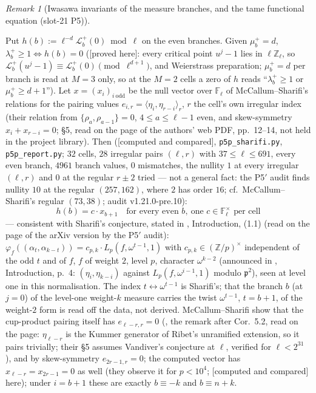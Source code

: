 \documentclass[11pt]{article}
\theoremstyle{remark}
\newtheorem{remark}[theorem]{Remark}
\newcommand{\F}{\mathbb{F}}
\newcommand{\Z}{\mathbb{Z}}
\newcommand{\PROVED}{\textsf{[proved here]}}
\newcommand{\CMPD}{\textsf{[computed and compared]}}   %
\begin{document}
\begin{remark}[Iwasawa invariants of the measure branches, and the tame functional equation (slot-21 P5)]
\begin{enumerate}
  Put $h(b):=\ell^{-d}\mathcal L^{+}_b(0)\bmod\ell$ on the even branches. Given $\mu^{+}_b=d$, $\lambda^{+}_b\ge1\iff h(b)=0$ (\PROVED: every critical point $u^{j}-1$ lies in $\ell\Z_\ell$, so
  $\mathcal L^{+}_b(u^{j}-1)\equiv\mathcal L^{+}_b(0)\pmod{\ell^{d+1}}$, and Weierstrass preparation; $\mu^{+}_b=d$ per branch is read at $M=3$ only, so at the $M=2$ cells a zero of $h$ reads
  ``$\lambda^{+}_b\ge1$ or $\mu^{+}_b\ge d+1$''). Let $x=(x_i)_{i\ \mathrm{odd}}$ be the null vector over $\F_\ell$ of McCallum--Sharifi's relations for the pairing values
  $e_{i,r}=\langle\eta_i,\eta_{r-i}\rangle_r$, $r$ the cell's own irregular index (their relation from $\{\rho_a,\rho_{a-1}\}=0$, $4\le a\le\ell-1$ even, and skew-symmetry $x_i+x_{r-i}=0$;
  \cite{mccallum_sharifi} \S5, read on the page of the authors' web PDF, pp.~12--14, not held in the project library). Then (\CMPD, \texttt{p5p\_sharifi.py}, \texttt{p5p\_report.py}; $32$ cells,
  $28$ irregular pairs $(\ell,r)$ with $37\le\ell\le691$, every even branch, $4961$ branch values, $0$ mismatches, the nullity $1$ at every irregular $(\ell,r)$ and $0$ at the regular $r\pm2$ tried --- not a general fact: the P5$'$ audit finds nullity $10$ at the regular $(257,162)$, where $2$ has order $16$; cf.\ McCallum--Sharifi's
  regular $(73,38)$; audit v1.21.0-pre.10):
  \[h(b)=c\cdot x_{b+1}\quad\text{for every even }b,\ \text{one }c\in\F_\ell^{\times}\text{ per cell}\]
  --- consistent with Sharifi's conjecture, stated in \cite{sharifi_reciprocity}, Introduction, (1.1) (read on the page of the arXiv version by the P5$'$ audit): $\varphi_f((\alpha_t,\alpha_{k-t}))=c_{p,k}\cdot L_p(f,\omega^{t-1},1)$
  with $c_{p,k}\in(\Z/p)^{\times}$ independent of the odd $t$ and of $f$, $f$ of weight $2$, level $p$, character $\omega^{k-2}$ (announced in \cite{sharifi_eisenstein}, Introduction, p.~4: $(\eta_i,\eta_{k-i})$ against $L_p(f,\omega^{i-1},1)$ modulo
  $\mathfrak p^{2}$), seen at level one in this normalisation. The index $t\leftrightarrow\omega^{t-1}$ is Sharifi's; that the branch $b$ (at $j=0$) of the level-one weight-$k$ measure carries the twist $\omega^{t-1}$, $t=b+1$, of the weight-$2$ form
  is read off the data, not derived. McCallum--Sharifi show that the cup-product pairing itself has $e_{\ell-r,r}=0$ (\cite{mccallum_sharifi}, the remark after Cor.~5.2, read on the page:
  $\eta_{\ell-r}$ is the Kummer generator of Ribet's unramified extension, so it pairs trivially; their \S5 assumes Vandiver's conjecture at $\ell$, verified for $\ell<2^{31}$ \cite{hho}), and by skew-symmetry $e_{2r-1,r}=0$; the computed
  vector has $x_{\ell-r}=x_{2r-1}=0$ as well (they observe it for $p<10^{4}$; \CMPD{} here); under $i=b+1$ these are exactly $b\equiv-k$ and $b\equiv n+k$.

\end{enumerate}
\end{remark}
\end{document}

